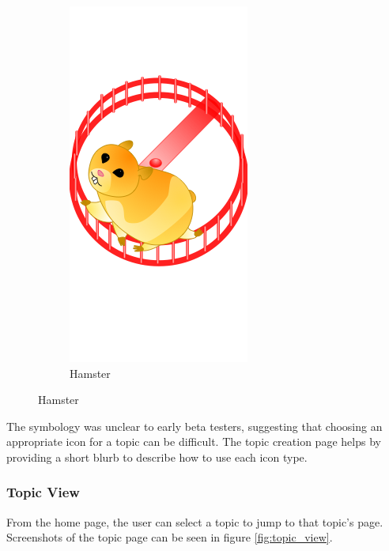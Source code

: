 \begin{figure}
\begin{subfigure}[b]{0.3\textwidth}
        \includegraphics[width=.7\textwidth]{ic_hamster2.png}
        \caption{Hamster}
      \end{subfigure}
      \label{fig:icon_types}
    \end{figure}

      The symbology was unclear to early beta testers,
      suggesting that choosing an appropriate icon for a topic can be difficult.
      The topic creation page helps by providing
      a short blurb to describe how to use each icon type.

      \subsubsection{Topic View}
      From the home page,
      the user can select a topic to jump to that topic's page.
      Screenshots of the topic page can be seen in figure \ref{fig:topic_view}.

